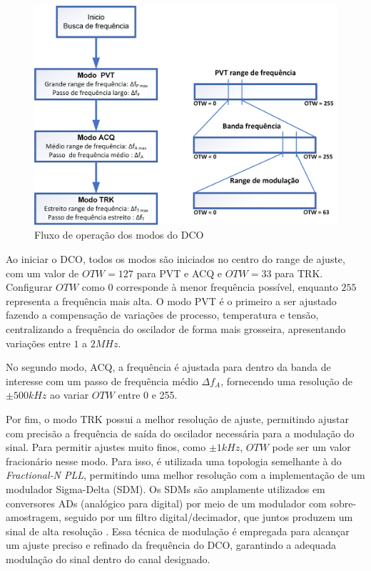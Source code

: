\begin{figure}[h!]
	\caption{Fluxo de operação dos modos do DCO }
	\begin{center}
		\includegraphics[scale=0.6]{img/bank_modos.png}
	\end{center}
	\label{fig:bank_modos}
\end{figure}

Ao iniciar o DCO, todos os modos são iniciados no centro do range de ajuste, com um valor de $OTW=127$ para PVT e ACQ e $OTW=33$ para TRK. Configurar $OTW$ como $0$ corresponde à menor frequência possível, enquanto $255$ representa a frequência mais alta. O modo PVT é o primeiro a ser ajustado fazendo a compensação de variações de processo, temperatura e tensão, centralizando a frequência do oscilador de forma mais grosseira, apresentando variações entre $1$ a $2MHz$.

No segundo modo, ACQ, a frequência é ajustada para dentro da banda de interesse com um passo de frequência médio $\Delta f_A$, fornecendo uma resolução de $\pm 500kHz$ ao variar $OTW$ entre 0 e 255.

Por fim, o modo TRK possui a melhor resolução de ajuste, permitindo ajustar com precisão a frequência de saída do oscilador necessária para a modulação do sinal. Para permitir ajustes muito finos, como $\pm 1kHz$, $OTW$ pode ser um valor fracionário nesse modo. Para isso, é utilizada uma topologia semelhante à do \textit{Fractional-N PLL}, permitindo uma melhor resolução com a implementação de um modulador Sigma-Delta (SDM). Os SDMs são amplamente utilizados em conversores ADs (analógico para digital) por meio de um modulador com sobre-amostragem, seguido por um filtro digital/decimador, que juntos produzem um sinal de alta resolução \cite{sdmtexas}. Essa técnica de modulação é empregada para alcançar um ajuste preciso e refinado da frequência do DCO, garantindo a adequada modulação do sinal dentro do canal designado.


